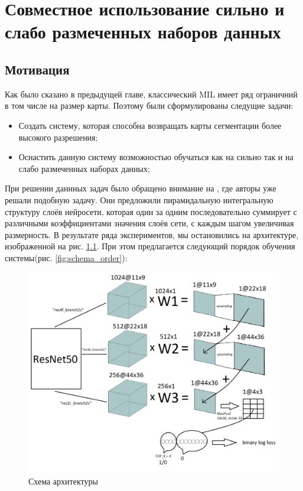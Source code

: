 \chapter{Совместное использование сильно и слабо размеченных наборов данных} \label{chapt3}

\section{Мотивация} \label{sect3_1}

Как было сказано в предыдущей главе, классический MIL имеет ряд ограничний в том числе на размер карты. Поэтому были сформулированы следущие задачи:

\begin{itemize}
    \item Создать систему, которая способна возвращать карты сегментации более высокого разрешения;
    \item Оснастить данную систему возможностью обучаться как на сильно так и на слабо размеченных наборах данных;
\end{itemize}

\noindent При решении даннных задач было обращено внимание на \cite{retinopathy}, где авторы уже решали подобную задачу. Они предложили пирамидальную интегральную структуру слоёв нейросети, которая один за одним последовательно суммирует с различными коэффициентами значения слоёв сети, с каждым шагом увеличивая размерность. В результате ряда экспериментов, мы остановились на архитектуре, изображенной на рис. \ref{fig:schema_total}. При этом предлагается следующий порядок обучения системы(рис. \ref{fig:schema_order}):

\begin{figure}[h] 
  \center
  \includegraphics [scale=0.64] {images/schema_total.png}
  \caption{Схема архитектуры} 
  \label{fig:schema_total}  
\end{figure}


